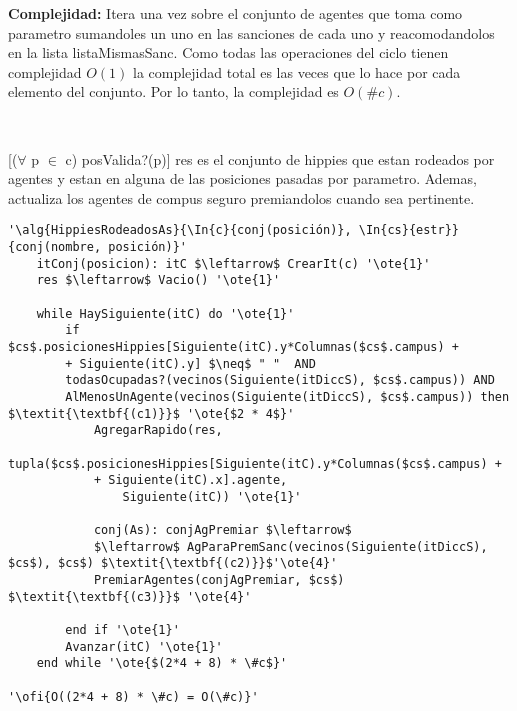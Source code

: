 \textbf{Complejidad:} Itera una vez sobre el conjunto de agentes que toma como parametro sumandoles un uno en las sanciones de cada uno y reacomodandolos en la lista listaMismasSanc. Como todas las operaciones del ciclo tienen complejidad $O(1)$ la complejidad total es las veces que lo hace por cada elemento del conjunto. Por lo tanto, la complejidad es $O(\#c)$.

~


[($\forall$ p $\in$ c) posValida?(p)]
{res es el conjunto de hippies que estan rodeados por agentes y estan en alguna de las posiciones pasadas por parametro. Ademas, actualiza los agentes de compus seguro premiandolos cuando sea pertinente.}

\begin{lstlisting}[mathescape]
'\alg{HippiesRodeadosAs}{\In{c}{conj(posición)}, \In{cs}{estr}}{conj(nombre, posición)}'
	itConj(posicion): itC $\leftarrow$ CrearIt(c) '\ote{1}'
	res $\leftarrow$ Vacio() '\ote{1}'

	while HaySiguiente(itC) do '\ote{1}'
		if $cs$.posicionesHippies[Siguiente(itC).y*Columnas($cs$.campus) +
		+ Siguiente(itC).y] $\neq$ " "  AND
		todasOcupadas?(vecinos(Siguiente(itDiccS), $cs$.campus)) AND
		AlMenosUnAgente(vecinos(Siguiente(itDiccS), $cs$.campus)) then $\textit{\textbf{(c1)}}$ '\ote{$2 * 4$}'
			AgregarRapido(res,
			tupla($cs$.posicionesHippies[Siguiente(itC).y*Columnas($cs$.campus) +
			+ Siguiente(itC).x].agente,
				Siguiente(itC)) '\ote{1}'

			conj(As): conjAgPremiar $\leftarrow$
			$\leftarrow$ AgParaPremSanc(vecinos(Siguiente(itDiccS), $cs$), $cs$) $\textit{\textbf{(c2)}}$'\ote{4}'
			PremiarAgentes(conjAgPremiar, $cs$) $\textit{\textbf{(c3)}}$ '\ote{4}'

		end if '\ote{1}'
		Avanzar(itC) '\ote{1}'
	end while '\ote{$(2*4 + 8) * \#c$}'

'\ofi{O((2*4 + 8) * \#c) = O(\#c)}'
\end{lstlisting}

